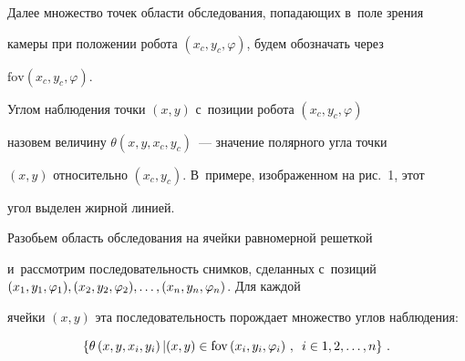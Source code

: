   

  \noindent

Далее множество точек области обследования, попадающих в~поле зрения 

камеры при положении робота $(x_c, y_c,\varphi)$, будем обозначать через 

$\mathrm{fov}\left( x_c, y_c,\varphi\right)$.







  Углом наблюдения точки $(x,y)$ с~позиции робота $(x_c, y_c, \varphi)$ 

назовем величину $\theta(x,y,x_c,y_c)$~--- значение полярного угла точки  

$(x, y)$ относительно $(x_c, y_c)$. В~примере, изображенном на рис.~1, этот 

угол выделен жирной линией.

  

  

  

  Разобьем область обследования на ячейки равномерной решеткой 

и~рассмотрим последовательность снимков, сделанных с~позиций $(x_1, 

y_1,\varphi_1),\linebreak (x_2, y_2, \varphi_2), \ldots , (x_n, y_n, \varphi_n)$. Для каждой 

ячейки $(x,y)$ эта последовательность порождает множество углов наблюдения:

  $$

  \left\{ \theta\left(x,y,x_i,y_i\right) \vert (x,y)\in \mathrm{fov} \left( x_i, y_i, 

\varphi_i\right)\,,\enskip i\in 1,2,\ldots , n\right\}\,.

  $$

  


